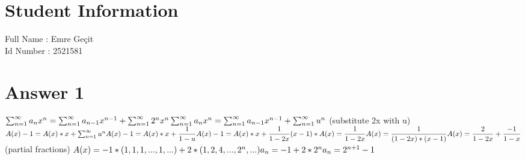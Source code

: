 \documentclass[12pt]{article}
\begin{document}
\section*{Student Information } 
Full Name : Emre Geçit \\
Id Number : 2521581\\

\section*{Answer 1}
$\sum_{n=1}^{\infty} a_nx^{n} = \sum_{n=1}^{\infty} a_{n-1}x^{n-1} + \sum_{n=1}^{\infty}2^nx^{n}\\\\
\sum_{n=1}^{\infty} a_nx^{n} = \sum_{n=1}^{\infty} a_{n-1}x^{n-1} + \sum_{n=1}^{\infty}u^{n}$ (substitute 2x with u)$\\\\
A(x)-1=A(x)*x+\sum_{n=1}^{\infty}u^{n}\\\\
A(x)-1=A(x)*x+\dfrac{1}{1-u}\\\\
A(x)-1=A(x)*x+\dfrac{1}{1-2x}\\\\
(x-1)*A(x)=\dfrac{1}{1-2x}\\\\
A(x)=\dfrac{1}{(1-2x)*(x-1)}\\\\
A(x)=\dfrac{2}{1-2x}+\dfrac{-1}{1-x}$ (partial fractions)
$\\\\A(x)=-1*(1,1,1,...,1,...)+2*(1,2,4,...,2^n,...)\\\\
a_n=-1+2*2^n\\\\
a_n=2^{n+1}-1\\\\$
\end{document}
